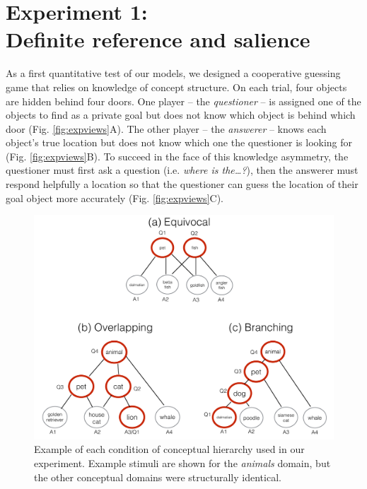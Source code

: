 \documentclass[11pt, floatsintext]{apa6}
\begin{document}
\section{Experiment 1: \\ Definite reference and salience}

As a first quantitative test of our models, we designed a cooperative guessing game that relies on knowledge of concept structure. 
On each trial, four objects are hidden behind four doors.
One player -- the \emph{questioner} -- is assigned one of the objects to find as a private goal but does not know which object is behind which door (Fig. \ref{fig:expviews}A).
The other player -- the \emph{answerer} -- knows each object's true location but does not know which one the questioner is looking for (Fig. \ref{fig:expviews}B). 
To succeed in the face of this knowledge asymmetry, the questioner must first ask a question (i.e. \emph{where is the\dots?}), then the answerer must respond helpfully a location so that the questioner can guess the location of their goal object more accurately (Fig. \ref{fig:expviews}C).

\begin{figure}[th!]
\begin{center}
\includegraphics[scale = .5]{Exp1/hierarchyStructureExamples.pdf}
\end{center}
\caption{\footnotesize  Example of each condition of conceptual hierarchy used in our experiment. Example stimuli are shown for the \emph{animals} domain, but the other conceptual domains were structurally identical.}
\label{fig:hierarchyStructures}
\end{figure}
\end{document}
